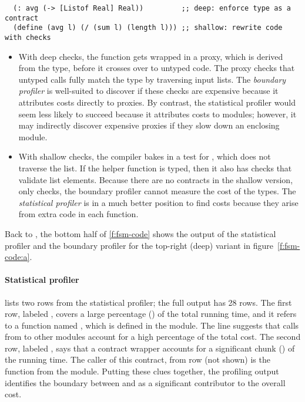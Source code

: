 \begin{verbatim}
  (: avg (-> [Listof Real] Real))         ;; deep: enforce type as a contract
  (define (avg l) (/ (sum l) (length l))) ;; shallow: rewrite code with checks
\end{verbatim}

\begin{itemize}
  \item
    With deep checks, the function gets wrapped in a proxy, which is
    derived from the type, before it crosses over to untyped code.
    The proxy checks that untyped calls
    fully match the type by traversing input lists.
    The \emph{boundary profiler} is well-suited to discover if these
    checks are expensive because it attributes costs directly to proxies.
    By contrast, the statistical profiler would seem less likely to
    succeed because it attributes costs to modules; however, it may
    indirectly discover expensive proxies if they slow down an enclosing
    module.
  \item
    With shallow checks, the compiler bakes in a test for
    , which does not traverse the list.
    If the helper function  is typed, then it also has checks
    that validate list elements.
    Because there are no contracts in the shallow version, only checks, the
    boundary profiler cannot measure the cost of the types.
    The \emph{statistical profiler} is in a much better position to find
    costs because they arise from extra code in each function.
\end{itemize}

Back to , the bottom half of \cref{f:fsm-code} shows the output of the statistical
profiler and the boundary profiler for the top-right (deep) variant in
figure~\ref{f:fsm-code:a}.

\paragraph{Statistical profiler}  lists two
rows from the statistical profiler; the full output has 28 rows.  The
first row, labeled \code{[17]}, covers a large percentage () of the
total running time, and it refers to a function named , which is
defined in the  module. The line suggests that calls from
 to other modules account for a high percentage of the total cost.
The second row, labeled \code{[24]}, says that a contract wrapper accounts for a
significant chunk () of the running time.  The caller of this
contract, from row \code{[19]} (not shown) is the function 
from the  module.  Putting these clues together, the profiling output
identifies the boundary between  and  as a significant
contributor to the overall cost. 

